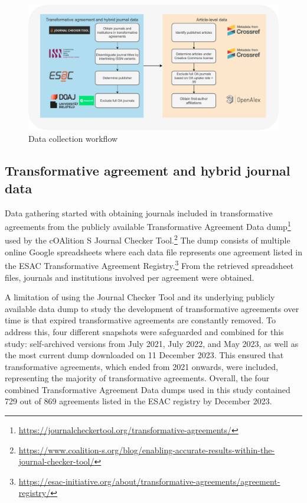 \documentclass[a4paper,man,floatsintext,longtable,noextraspace,12pt]{apa6}
\begin{document}
\begin{figure}[ht!]

{\centering \includegraphics[width=0.99\linewidth,]{data_collection_workflow} 

}

\caption{Data collection workflow}\label{fig:data_workflow}
\end{figure}

\hypertarget{transformative-agreement-and-hybrid-journal-data}{%
\subsection{Transformative agreement and hybrid journal
data}\label{transformative-agreement-and-hybrid-journal-data}}

Data gathering started with obtaining journals included in
transformative agreements from the publicly available Transformative
Agreement Data dump\footnote{\url{https://journalcheckertool.org/transformative-agreements/}}
used by the cOAlition S Journal Checker Tool.\footnote{\url{https://www.coalition-s.org/blog/enabling-accurate-results-within-the-journal-checker-tool/}}
The dump consists of multiple online Google spreadsheets where each data
file represents one agreement listed in the ESAC Transformative
Agreement Registry.\footnote{\url{https://esac-initiative.org/about/transformative-agreements/agreement-registry/}}
From the retrieved spreadsheet files, journals and institutions involved
per agreement were obtained.

A limitation of using the Journal Checker Tool and its underlying
publicly available data dump to study the development of transformative
agreements over time is that expired transformative agreements are
constantly removed. To address this, four different snapshots were
safeguarded and combined for this study: self-archived versions from
July 2021, July 2022, and May 2023, as well as the most current dump
downloaded on 11 December 2023. This ensured that transformative
agreements, which ended from 2021 onwards, were included, representing
the majority of transformative agreements. Overall, the four combined
Transformative Agreement Data dumps used in this study contained 729 out
of 869 agreements listed in the ESAC registry by December 2023.
\end{document}
